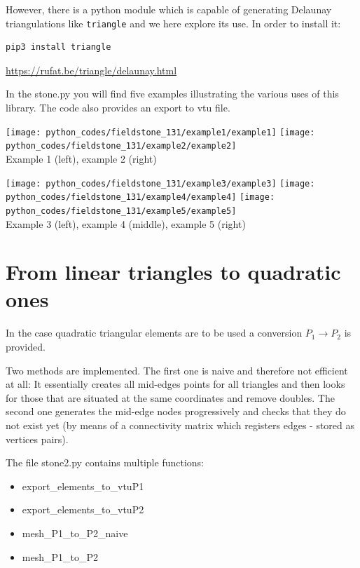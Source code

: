 However, there is a python module which is capable of generating Delaunay triangulations like {\tt triangle}
and we here explore its use. In order to install it:
\begin{verbatim}
pip3 install triangle
\end{verbatim}

\url{https://rufat.be/triangle/delaunay.html}

In the {\python stone.py} you will find five examples illustrating the various 
uses of this library. The code also provides an export to vtu file. 


\begin{center}
\texttt{[image: python\_codes/fieldstone\_131/example1/example1]}
\texttt{[image: python\_codes/fieldstone\_131/example2/example2]}\\
{\captionfont Example 1 (left), example 2 (right)}
\end{center}


\begin{center}
\texttt{[image: python\_codes/fieldstone\_131/example3/example3]}
\texttt{[image: python\_codes/fieldstone\_131/example4/example4]}
\texttt{[image: python\_codes/fieldstone\_131/example5/example5]}\\
{\captionfont Example 3 (left), example 4 (middle), example 5 (right)}
\end{center}

\section*{From linear triangles to quadratic ones}

In the case quadratic triangular elements are to be used a conversion $P_1 \rightarrow P_2$
is provided.

Two methods are implemented. The first one is naive and therefore not efficient at all:
It essentially creates all mid-edges points for all triangles and then looks for those 
that are situated at the same coordinates and remove doubles. 
The second one generates the mid-edge nodes progressively and checks that they do not 
exist yet (by means of a connectivity matrix which registers edges - 
stored as vertices pairs).


The file {\pythonfile stone2.py} contains multiple functions:
\begin{itemize}
\item {\pythonfile export\_elements\_to\_vtuP1}
\item {\pythonfile export\_elements\_to\_vtuP2}
\item {\pythonfile mesh\_P1\_to\_P2\_naive}
\item {\pythonfile mesh\_P1\_to\_P2}
\end{itemize}

